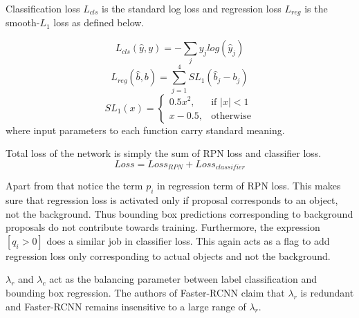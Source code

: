 Classification loss $L_{cls}$ is the standard log loss and regression loss $L_{reg}$ is the smooth-$L_1$ loss as defined below. 

$$ L_{cls}(\hat{y},y) = -\sum_j y_jlog(\hat{y}_j) $$
$$ L_{reg}(\hat{b},b) = \sum_{j=1}^4 SL_1(\hat{b}_j - b_j) $$
$$SL_1(x) = \begin{cases}
0.5x^2, & \text{if } |x|<1 \\
x-0.5,  & \text{otherwise}
\end{cases}
$$
where input parameters to each function carry standard meaning. 

Total loss of the network is simply the sum of RPN loss and classifier loss.
$$ Loss = Loss_{RPN} + Loss_{classifier} $$

Apart from that notice the term $p_i$ in regression term of RPN loss. This makes sure that regression loss is activated only if proposal corresponds to an object, not the background.  Thus bounding box predictions corresponding to background proposals do not contribute towards training. Furthermore, the expression $[q_i>0]$ does a similar job in classifier loss. This again acts as a flag to add regression loss only corresponding to actual objects and not the background. 

$\lambda_r$ and $\lambda_c$ act as the balancing parameter  between label classification and bounding box regression. The authors of Faster-RCNN claim that $\lambda_r$ is redundant and Faster-RCNN remains insensitive to a large range of $\lambda_r$. 



\newpage














